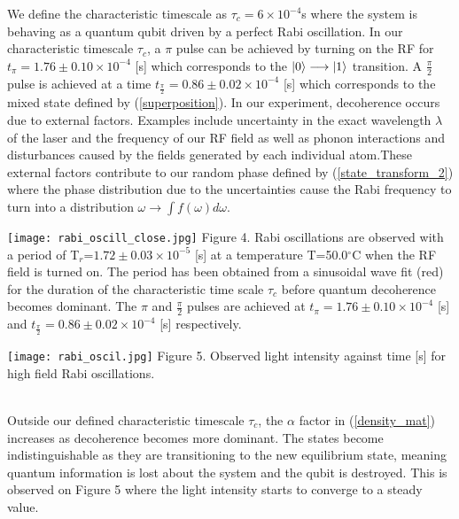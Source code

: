 \documentclass{article}
\DeclarePairedDelimiter\ket{\lvert}{\rangle}
\begin{document}
\begin{multicols*}{2}
We define the characteristic timescale as $\tau_c=6\times10^{-4}$s where the system is behaving as a quantum qubit driven by a perfect Rabi oscillation. In our characteristic timescale $\tau_c$, a $\pi$ pulse can be achieved by turning on the RF for $t_{\pi}=1.76\pm0.10\times10^{-4}$ [s] which corresponds to the $\ket{0}\longrightarrow\ket{1}$ transition. A $\frac{\pi}{2}$ pulse is achieved at a time $t_{\frac{\pi}{2}}=0.86\pm0.02\times10^{-4}$ [s] which corresponds to the mixed state defined by (\ref{superposition}). In our experiment, decoherence occurs due to external factors. Examples include uncertainty in the exact wavelength $\lambda$ of the laser and the frequency of our RF field as well as phonon interactions and disturbances caused by the fields generated by each individual atom.These external factors contribute to our random phase defined by (\ref{state_transform_2}) where the phase distribution due to the uncertainties cause the Rabi frequency to turn into a distribution $\omega \longrightarrow \int f(\omega)d\omega$.
\\

\begin{Figure}
\centering
\texttt{[image: rabi\_oscill\_close.jpg]}
\footnotesize
    Figure 4. Rabi oscillations are observed with a period of T$_r$=$1.72\pm0.03\times10^{-5}$ [s] at a temperature T=50.0$^\circ$C when the RF field is turned on. The period has been obtained from a sinusoidal wave fit (red) for the duration of the characteristic time scale $\tau_c$ before quantum decoherence becomes dominant. The $\pi$ and $\frac{\pi}{2}$ pulses are achieved at $t_{\pi}=1.76\pm0.10\times10^{-4}$ [s] and $t_{\frac{\pi}{2}}=0.86\pm0.02\times10^{-4}$ [s] respectively.
\normalsize
\end{Figure}
\newline
\begin{Figure}
\centering
\texttt{[image: rabi\_oscil.jpg]}
\footnotesize
    Figure 5. Observed light intensity against time [s] for high field Rabi oscillations.
\normalsize
\end{Figure}
\\
\newline
 Outside our defined characteristic timescale $\tau_c$, the $\alpha$ factor in (\ref{density_mat}) increases as decoherence becomes more dominant. The states become indistinguishable as they are transitioning to the new equilibrium state, meaning quantum information is lost about the system and the qubit is destroyed. This is observed on Figure 5 where the light intensity starts to converge to a steady value.



\end{multicols*}
\end{document}
